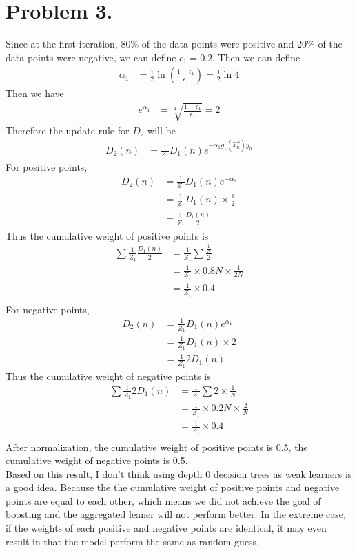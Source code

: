 \documentclass{article}
\begin{document}
    \section*{Problem 3.}
    Since at the first iteration, 80\% of the data points were positive and 20\% of the data points were 
    negative, we can define $\epsilon_1 = 0.2$. Then we can define 
    \begin{align*}
        \alpha_1 &= \frac{1}{2}\ln(\frac{1 - \epsilon_1}{\epsilon_1}) = \frac{1}{2}\ln4
    \end{align*}
    Then we have 
    \begin{align*}
        e^{\alpha_1} &= \sqrt[2]{\frac{1 - \epsilon_1}{\epsilon_1}} = 2
    \end{align*} 
    Therefore the update rule for $D_2$ will be 
    \begin{align*}
        D_2(n) &= \frac{1}{Z_1} D_1(n) e^{-\alpha_1 g_1(\overset{\to}{x_n}) y_n}
    \end{align*}
    For positive points, 
    \begin{align*}
        D_2(n) &= \frac{1}{Z_1} D_1(n) e^{-\alpha_1}\\
        &= \frac{1}{Z_1} D_1(n) \times \frac{1}{2}\\
        &= \frac{1}{Z_1} \frac{D_1(n)}{2}
    \end{align*}
    Thus the cumulative weight of positive points is 
    \begin{align*}
        \sum \frac{1}{Z_1} \frac{D_1(n)}{2} &= \frac{1}{Z_1} \sum \frac{\frac{1}{N}}{2}\\
        &= \frac{1}{Z_1} \times 0.8N \times \frac{1}{2N}\\
        &= \frac{1}{Z_1} \times 0.4\\
    \end{align*}
    For negative points,
    \begin{align*}
        D_2(n) &= \frac{1}{Z_1} D_1(n) e^{\alpha_1}\\
        &= \frac{1}{Z_1} D_1(n) \times 2\\
        &= \frac{1}{Z_1} 2D_1(n)
    \end{align*}
    Thus the cumulative weight of negative points is 
    \begin{align*}
        \sum \frac{1}{Z_1} 2D_1(n) &= \frac{1}{Z_1} \sum 2 \times \frac{1}{N}\\
        &= \frac{1}{Z_1} \times 0.2N \times \frac{2}{N}\\
        &= \frac{1}{Z_1} \times 0.4\\
    \end{align*}
    After normalization, the cumulative weight of positive points is 0.5, the cumulative weight of negative
    points is 0.5.\\
    Based on this result, I don't think using depth 0 decision trees as weak learners is a good idea. Because 
    the the cumulative weight of positive points and negative points are equal to each other, which means we 
    did not achieve the goal of boosting and the aggregated leaner will not perform better. In the extreme case, 
    if the weights of each positive and negative points are identical, it may even result in that the model 
    perform the same as random guess.
\end{document}
